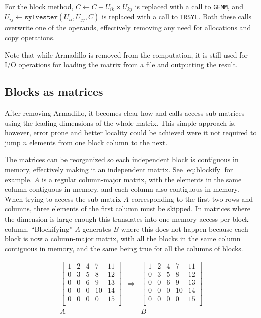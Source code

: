 \documentclass[../thesis]{subfiles}
\begin{document}
	For the block method, $C \leftarrow C - U_{ik} \times U_{kj}$ is replaced with a call to \blas\texttt{GEMM}, and $U_{ij} \leftarrow \mathtt{sylvester} \left( U_{ii}, U_{jj}, C\right)$ is replaced with a call to \lapack\texttt{TRSYL}. Both these calls overwrite one of the operands, effectively removing any need for allocations and copy operations.

	Note that while Armadillo is removed from the computation, it is still used for I/O operations for loading the matrix from a file and outputting the result.

	\subsection{Blocks as matrices}
	\label{subsec:blockify}
	After removing Armadillo, it becomes clear how \blas and \lapack calls access sub-matrices using the leading dimensions of the whole matrix. This simple approach is, however, error prone and better locality could be achieved were it not required to jump $n$ elements from one block column to the next.

	The matrices can be reorganized so each independent block is contiguous in memory, effectively making it an independent matrix. See \cref{eq:blockify} for example. $A$ is a regular column-major matrix, with the elements in the same column contiguous in memory, and each column also contiguous in memory. When trying to access the sub-matrix $A$ corresponding to the first two rows and columns, three elements of the first column must be skipped. In matrices where the dimension is large enough this translates into one memory access per block column. ``Blockifying'' $A$ generates $B$ where this does not happen because each block is now a column-major matrix, with all the blocks in the same column contiguous in memory, and the same being true for all the columns of blocks.

	\begin{equation}
		\begin{array}{ccc}
			\left[
			\begin{array}{c|c|c|c|c}
				 1 &  2 &  4 &  7 & 11  \\
				 0 &  3 &  5 &  8 & 12  \\
				 0 &  0 &  6 &  9 & 13  \\
				 0 &  0 &  0 & 10 & 14  \\
				 0 &  0 &  0 &  0 & 15  \\
			\end{array}
			\right] & \Rightarrow & \left[
			\begin{array}{cc|cc|c}
				 1 &  2 &  4 &  7 & 11  \\
				 0 &  3 &  5 &  8 & 12  \\
				 \hline
				 0 &  0 &  6 &  9 & 13  \\
				 0 &  0 &  0 & 10 & 14  \\
				 \hline
				 0 &  0 &  0 &  0 & 15  \\
			\end{array}
			\right] \\
			A & & B
		\end{array}
		\label{eq:blockify}
	\end{equation}
\end{document}
